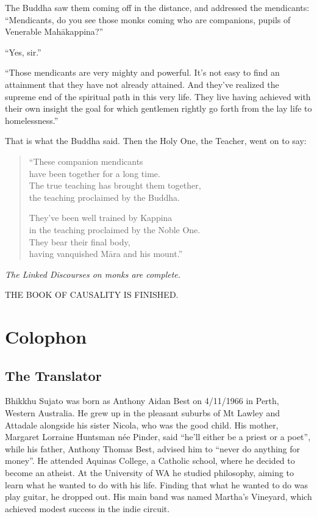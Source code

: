 \documentclass[12pt,openany]{book}%
\newcommand*{\scendsutta}[1]{\begin{center}\textit{#1}\end{center}}
\newcommand*{\scendbook}[1]{\begin{center}\uppercase{#1}\end{center}}
\let\oldbackmatter\backmatter
\renewcommand{\backmatter}{%
\chapterfont{\setstretch{.85}\normalfont\centering}%
\sectionfont{\setstretch{.85}\Semiboldsubheadfont}%
\oldbackmatter}
\begin{document}
The Buddha saw them coming off in the distance, and addressed the mendicants: “Mendicants, do you see those monks coming who are companions, pupils of Venerable \textsanskrit{Mahākappina}?” 

“Yes, sir.” 

“Those mendicants are very mighty and powerful. It’s not easy to find an attainment that they have not already attained. And they’ve realized the supreme end of the spiritual path in this very life. They live having achieved with their own insight the goal for which gentlemen rightly go forth from the lay life to homelessness.” 

That is what the Buddha said. Then the Holy One, the Teacher, went on to say: 

\begin{verse}%
“These companion mendicants \\
have been together for a long time. \\
The true teaching has brought them together, \\
the teaching proclaimed by the Buddha. 

They’ve been well trained by Kappina \\
in the teaching proclaimed by the Noble One. \\
They bear their final body, \\
having vanquished \textsanskrit{Māra} and his mount.” 

%
\end{verse}

\scendsutta{The Linked Discourses on monks are complete. }

\scendbook{The Book of Causality is finished. }

%
\backmatter%
\chapter*{Colophon}

\section*{The Translator}

Bhikkhu Sujato was born as Anthony Aidan Best on 4/11/1966 in Perth, Western Australia. He grew up in the pleasant suburbs of Mt Lawley and Attadale alongside his sister Nicola, who was the good child. His mother, Margaret Lorraine Huntsman née Pinder, said “he’ll either be a priest or a poet”, while his father, Anthony Thomas Best, advised him to “never do anything for money”. He attended Aquinas College, a Catholic school, where he decided to become an atheist. At the University of WA he studied philosophy, aiming to learn what he wanted to do with his life. Finding that what he wanted to do was play guitar, he dropped out. His main band was named Martha’s Vineyard, which achieved modest success in the indie circuit. 
\end{document}
